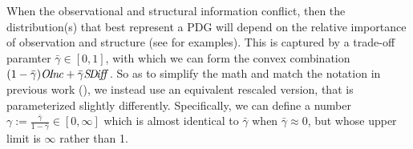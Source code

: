 \documentclass{article}
\newcommand\discard[1]{}
\newcommand\zogamma{{\bar\gamma}}
\newcommand\otodo[2][]{\todo[color=olicolor!30!white,#1]{#2}}
\begin{document}
When the observational and structural information conflict, then the distribution(s)
that best represent a PDG will depend on the relative importance of observation and structure (see  for examples).
\discard{ This is captured by a trade-off 
    parameter $\gamma \ge 0$, which 
    can be used to define the scoring function
    $\bbr{\dg M}_\gamma: \Delta \V\!\X \to \Rext$, as follows:}%
%
This is captured by a trade-off paramter $\zogamma \in [0,1]$,
with which we can form the convex combination
$(1-\zogamma)\OInc + \zogamma \SDiff$. 
So as to 
simplify the math
and match the notation in
previous work (\citeyear{pdg-aaai,one-true-loss}),
we instead use an equivalent rescaled version, 
that is parameterized slightly differently.
Specifically, we can define 
a number
$\gamma := \frac{\zogamma}{1-\zogamma} \in [0,\infty]$
which is almost identical to $\zogamma$ when $\zogamma \approx 0$, but whose upper limit is $\infty$ rather than 1. 
\end{document}
